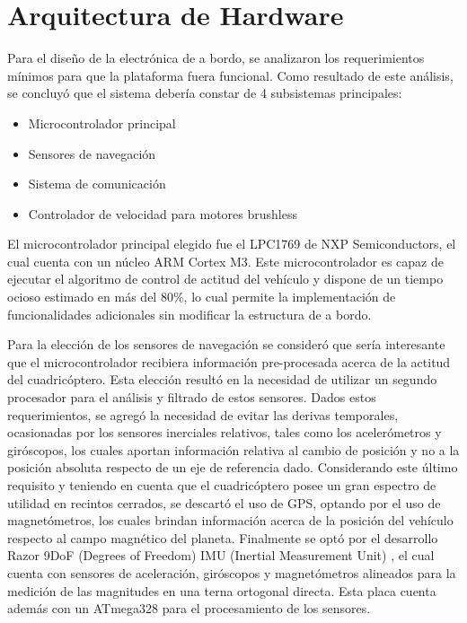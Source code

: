 \documentclass[a4paper, conference]{IEEEtran}
\begin{document}
\vspace{5 mm}

\section{Arquitectura de Hardware}

Para el diseño de la electrónica de a bordo, se analizaron los requerimientos mínimos para que la plataforma fuera funcional. Como resultado de este análisis, se concluyó que el sistema debería constar de 4 subsistemas principales: 
\begin{itemize}
\item Microcontrolador principal
\item Sensores de navegación 
\item Sistema de comunicación
\item Controlador de velocidad para motores brushless
\end{itemize}
	
El microcontrolador principal elegido fue el LPC1769 de NXP Semiconductors, el cual cuenta con un núcleo ARM Cortex M3.  Este microcontrolador es capaz de ejecutar el algoritmo de control de actitud del vehículo y dispone de un tiempo ocioso estimado en más del 80\%, lo cual permite la implementación de funcionalidades adicionales sin modificar la estructura de a bordo.

Para la elección de los sensores de navegación se consideró que sería interesante que el microcontrolador recibiera información pre-procesada acerca de la actitud del cuadricóptero. Esta elección resultó en la necesidad de utilizar un segundo procesador para el análisis y filtrado de estos sensores. Dados estos requerimientos, se agregó la necesidad de evitar las derivas temporales, ocasionadas por los sensores inerciales relativos, tales como los acelerómetros y giróscopos, los cuales aportan información relativa al cambio de posición y no a la posición absoluta respecto de un eje de referencia dado. Considerando este último requisito y teniendo en cuenta que el cuadricóptero posee un gran espectro de utilidad en recintos cerrados, se descartó el uso de GPS, optando por el uso de magnetómetros, los cuales brindan información acerca de la posición del vehículo respecto al campo magnético del planeta. Finalmente se optó por el desarrollo Razor 9DoF (Degrees of Freedom) IMU (Inertial Measurement Unit) \cite{razor9d0f}, el cual cuenta con sensores de aceleración, giróscopos y magnetómetros alineados para la medición de las magnitudes en una terna ortogonal directa. Esta placa cuenta además con un ATmega328 para el procesamiento de los sensores.
\end{document}
